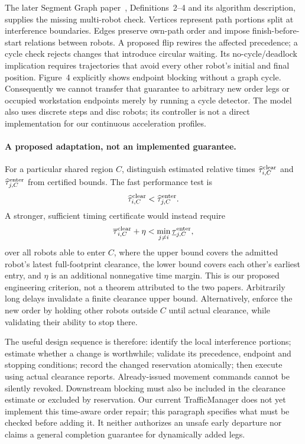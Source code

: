 \documentclass[11pt,a4paper]{article}
\theoremstyle{remark}
\newcounter{algorithm}
\begin{document}
The later Segment Graph paper~\cite{coskun2021}, Definitions~2--4 and its
algorithm description, supplies the missing multi-robot check. Vertices
represent path portions split at interference boundaries. Edges preserve
own-path order and impose finish-before-start relations between robots.
A proposed flip rewires the affected precedence; a cycle check rejects
changes that introduce circular waiting. Its no-cycle/deadlock implication
requires trajectories that avoid every other robot's initial and final
position. Figure~4 explicitly shows endpoint blocking without a graph cycle.
Consequently we cannot transfer that guarantee to arbitrary new order legs
or occupied workstation endpoints merely by running a cycle detector.
The model also uses discrete steps and disc robots; its controller is not
a direct implementation for our continuous acceleration profiles.

\paragraph{A proposed adaptation, not an implemented guarantee.}
For a particular shared region $C$, distinguish estimated relative times
$\widehat{\tau}^{\rm clear}_{i,C}$ and
$\widehat{\tau}^{\rm enter}_{j,C}$ from certified bounds. The fast
performance test is
\begin{equation}
 \widehat{\tau}^{\rm clear}_{i,C}
 < \widehat{\tau}^{\rm enter}_{j,C}.
 \label{eq:estimated-gap}
\end{equation}
A stronger, sufficient timing certificate would instead require
\begin{equation}
 \overline{\tau}^{\rm clear}_{i,C}+\eta
 <\min_{j\ne i}\underline{\tau}^{\rm enter}_{j,C},
 \label{eq:bounded-gap}
\end{equation}
over all robots able to enter $C$, where the upper bound covers the admitted
robot's latest full-footprint clearance, the lower bound covers each other's
earliest entry, and $\eta$ is an additional nonnegative time margin.
This is our proposed engineering criterion, not a theorem attributed to
the two papers. Arbitrarily long delays invalidate a finite clearance upper
bound. Alternatively, enforce the new order by holding other robots outside
$C$ until actual clearance, while validating their ability to stop there.

The useful design sequence is therefore: identify the local interference
portions; estimate whether a change is worthwhile; validate its precedence,
endpoint and stopping conditions; record the changed reservation atomically;
then execute using actual clearance reports. Already-issued movement commands
cannot be silently revoked. Downstream blocking must also be included in
the clearance estimate or excluded by reservation. Our current TrafficManager
does not yet implement this time-aware order repair; this paragraph specifies
what must be checked before adding it. It neither authorizes an unsafe early
departure nor claims a general completion guarantee for dynamically added legs.
\end{document}
